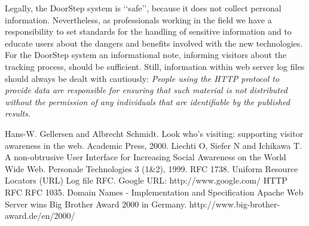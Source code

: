\documentclass[a4paper]{danarticle}
\theoremstyle{remark}
\begin{document}
    Legally, the DoorStep system is \lq\lq safe\rq\rq , because it does not
    collect personal information. Nevertheless, as professionals working in the
    field we have a responsibility to set standards for the handling of sensitive
    information and to educate users about the dangers and benefits involved with
    the new technologies. For the DoorStep system an informational note,
    informing visitors about the tracking process, should be sufficient.
    Still, information within web server log files should always be dealt with
    cautiously: \textit{People using the HTTP protocol to provide data are
    responsible for ensuring that such material is not distributed without the
    permission of any individuals that are identifiable by the published
    results}. \cite{http}\cite[Apache web server wins Big Brother
    Award]{bigBro}
  \begin{thebibliography}{99}
     Hans-W. Gellersen and Albrecht Schmidt.
    Look who's visiting: supporting visitor awareness in the web.
    Academic Press, 2000.
     Liechti O, Siefer N and Ichikawa T.
    A non-obtrusive User Interface for Increasing Social Awareness on the 
    World Wide Web. Personale Technologies 3 (1\&2), 1999.
     RFC 1738. Uniform Resource Locators (URL) 
     Log file RFC.
     Google URL: http://www.google.com/
     HTTP RFC
     RFC 1035. Domain Names - Implementation and Specification
     Apache Web Server wins Big Brother Award 2000 in Germany.
    http://www.big-brother-award.de/en/2000/
  \end{thebibliography}
\end{document}
